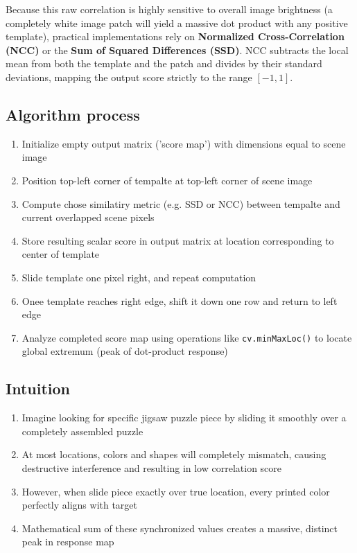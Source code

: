 \documentclass[12pt]{article}
\begin{document}
Because this raw correlation is highly sensitive to overall image brightness (a completely white image patch will yield a massive dot product with any positive template), practical implementations rely on \textbf{Normalized Cross-Correlation (NCC)} or the \textbf{Sum of Squared Differences (SSD)}. NCC subtracts the local mean from both the template and the patch and divides by their standard deviations, mapping the output score strictly to the range $[-1,1]$.

\subsection{Algorithm process}

\begin{enumerate}
    \item Initialize empty output matrix ('score map') with dimensions equal to scene image
    \item Position top-left corner of tempalte at top-left corner of scene image
    \item Compute chose similatiry metric (e.g. SSD or NCC) between tempalte and current overlapped scene pixels
    \item Store resulting scalar score in output matrix at location corresponding to center of template
    \item Slide template one pixel right, and repeat computation
    \item Onee template reaches right edge, shift it down one row and return to left edge
    \item Analyze completed score map using operations like \texttt{cv.minMaxLoc()} to locate global extremum (peak of dot-product response)
\end{enumerate}


\subsection{Intuition}
\begin{enumerate}
    \item Imagine looking for specific jigsaw puzzle piece by sliding it smoothly over a completely assembled puzzle
    \item At most locations, colors and shapes will completely mismatch, causing destructive interference and resulting in low correlation score
    \item However, when slide piece exactly over true location, every printed color perfectly aligns with target
    \item Mathematical sum of these synchronized values creates a massive, distinct peak in response map
\end{enumerate}
\end{document}

